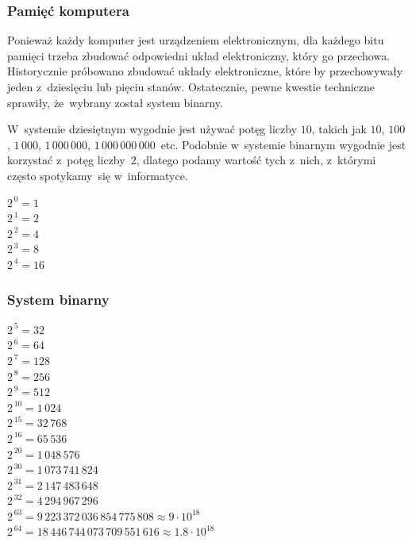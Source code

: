 \documentclass[10pt,t]{beamer}
\begin{document}
\begin{frame}
  \frametitle{Pamięć komputera}


  Ponieważ każdy komputer jest urządzeniem elektronicznym, dla każdego bitu
  pamięci trzeba zbudować odpowiedni układ elektroniczny, który go
  przechowa. Historycznie próbowano zbudować układy elektroniczne, które
  by przechowywały jeden z~dziesięciu lub pięciu stanów. Ostatecznie, pewne
  kwestie techniczne sprawiły, że~wybrany został system binarny.

  W~systemie dziesiętnym wygodnie jest używać potęg liczby $10$, takich jak
  $10$, $100$, $1 \, 000$, $1 \, 000 \, 000$, $1 \, 000 \, 000 \, 000$~etc.
  Podobnie w~systemie binarnym wygodnie jest korzystać z~potęg liczby~$2$,
  dlatego podamy wartość tych z~nich, z~którymi często spotykamy~się
  w~informatyce.

  $2^{ \, 0 } = 1$ \\
  $2^{ \, 1 } = 2$ \\
  $2^{ \, 2 } = 4$ \\
  $2^{ \, 3 } = 8$ \\
  $2^{ \, 4 } = 16$

\end{frame}





\begin{frame}
  \frametitle{System binarny}


  $2^{ \, 5 } = 32$ \\
  $2^{ \, 6 } = 64$ \\
  $2^{ \, 7 } = 128$ \\
  $2^{ \, 8 } = 256$ \\
  $2^{ \, 9 } = 512$ \\
  $2^{ \, 10 } = 1 \, 024$ \\
  $2^{ \, 15 } = 32 \, 768$ \\
  $2^{ \, 16 } = 65 \, 536$ \\
  $2^{ \, 20 } = 1 \, 048 \, 576$ \\
  $2^{ \, 30 } = 1 \, 073 \, 741 \, 824$ \\
  $2^{ \, 31 } = 2 \, 147 \, 483 \, 648$ \\
  $2^{ \, 32 } = 4 \, 294 \, 967 \, 296$ \\
  $2^{ \, 63 } = 9 \, 223 \, 372 \, 036 \, 854 \, 775 \, 808
  \approx 9 \cdot 10^{ 18 }$ \\
  $2^{ \, 64 } = 18 \, 446 \, 744 \, 073 \, 709 \, 551 \, 616
  \approx 1.8 \cdot 10^{ 18 }$

\end{frame}
\end{document}
